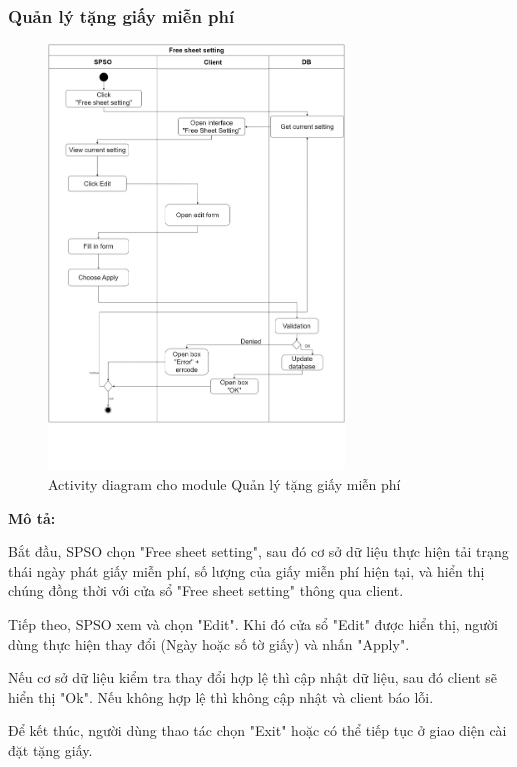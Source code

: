\subsubsection{Quản lý tặng giấy miễn phí}
\begin{figure}[H]
    \begin{center}
        \includegraphics[width=0.7\textwidth]{Images/System Modelling/FreeSheetSetting_Activity.png}
        \caption{Activity diagram cho module Quản lý tặng giấy miễn phí}
        \label{fig:arch}
    \end{center}
\end{figure}

\textbf{Mô tả:}\par
Bắt đầu, SPSO chọn "Free sheet setting", sau đó cơ sở dữ liệu thực hiện tải trạng thái ngày phát giấy miễn phí, số lượng của giấy miễn phí hiện tại, và hiển thị chúng đồng thời với cửa sổ "Free sheet setting" thông qua client. \par
Tiếp theo, SPSO xem và chọn "Edit". Khi đó cửa sổ "Edit" được hiển thị, người dùng thực hiện thay đổi (Ngày hoặc số tờ giấy) và nhấn "Apply".\par
Nếu cơ sở dữ liệu kiểm tra thay đổi hợp lệ thì cập nhật dữ liệu, sau đó client sẽ hiển thị "Ok". Nếu không hợp lệ thì không cập nhật và client báo lỗi.\par
Để kết thúc, người dùng thao tác chọn "Exit" hoặc có thể tiếp tục ở giao diện cài đặt tặng giấy.

